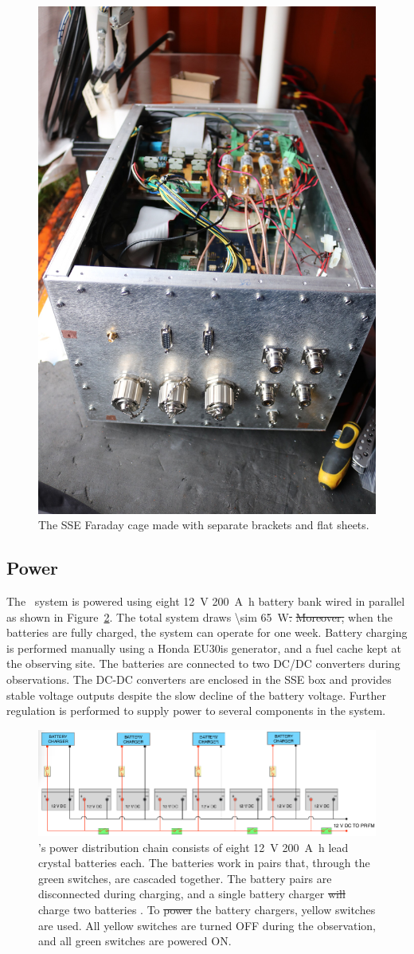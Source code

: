 \begin{figure}
	\centering
	\includegraphics[width=0.4\linewidth]{Figures/47093285614_63bb00be20_o}
	\caption{The SSE Faraday cage made with separate brackets and flat sheets.}
	\label{Fig:47093285614_63bb00be20_o}
\end{figure}       

\subsection{Power}

The \prizm\ system is powered using eight \SI{12}{\volt} \SI{200}{\ampere \hour} battery bank wired in parallel as shown in Figure~\ref{Fig:power}. The total system draws \SI{\sim 65}{\watt}\st{.}
\st{Moreover,} when the batteries are fully charged, the system can operate for  one week. Battery charging is performed manually using a Honda EU30is generator, and a fuel cache kept at the observing site. The batteries are connected to two DC/DC converters during observations. The DC-DC converters are enclosed in the SSE box and provides stable voltage outputs despite the slow decline of the battery voltage. Further regulation is performed to supply power to several components in the system.

\begin{figure}
	\centering
	\includegraphics[width=\linewidth]{Figures/power}
	\caption{\prizm's power distribution chain consists of eight \SI{12}{\volt} \SI{200}{\ampere \hour} lead crystal batteries each. The batteries work in pairs that, through the green switches, are cascaded together. The battery pairs are disconnected during charging, and a single battery charger \st{will} charge two batteries . To \st{power}  the battery chargers, yellow switches are used. All yellow switches are turned OFF during the observation, and all green switches are powered ON.}
	\label{Fig:power}
\end{figure}

